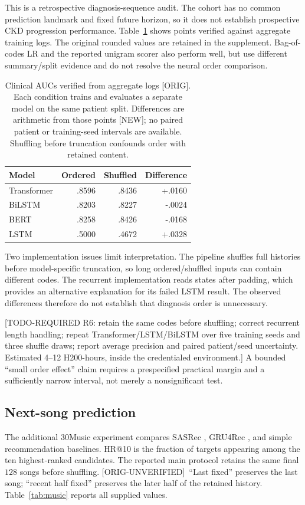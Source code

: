 \documentclass[10pt]{article}
\newcommand{\prov}[1]{{\color{black!65}\scriptsize[#1]}}
\newcommand{\orig}{\prov{ORIG}}
\newcommand{\ou}{\prov{ORIG-UNVERIFIED}}
\newcommand{\newres}{\prov{NEW}}
\newcommand{\req}[2]{{\color{brown!75!black}\small[TODO-REQUIRED #1: #2]}}
\begin{document}
This is a retrospective diagnosis-sequence audit. The cohort has no common prediction landmark and fixed future horizon, so it does not establish prospective CKD progression performance. Table~\ref{tab:clinical} shows points verified against aggregate training logs. The original rounded values are retained in the supplement. Bag-of-codes LR and the reported unigram scorer also perform well, but use different summary/split evidence and do not resolve the neural order comparison.

\begin{table}[H]
\centering\small
\caption{Clinical AUCs verified from aggregate logs \orig. Each condition trains and evaluates a separate model on the same patient split. Differences are arithmetic from those points \newres; no paired patient or training-seed intervals are available. Shuffling before truncation confounds order with retained content.}
\label{tab:clinical}
\begin{tabular}{@{}lrrr@{}}\toprule
Model & Ordered & Shuffled & Difference \\\midrule
Transformer & .8596 & .8436 & +.0160 \\
BiLSTM & .8203 & .8227 & -.0024 \\
BERT & .8258 & .8426 & -.0168 \\
LSTM & .5000 & .4672 & +.0328 \\
\bottomrule\end{tabular}
\end{table}

Two implementation issues limit interpretation. The pipeline shuffles full histories before model-specific truncation, so long ordered/shuffled inputs can contain different codes. The recurrent implementation reads states after padding, which provides an alternative explanation for its failed LSTM result. The observed differences therefore do not establish that diagnosis order is unnecessary.

\req{R6}{retain the same codes before shuffling; correct recurrent length handling; repeat Transformer/LSTM/BiLSTM over five training seeds and three shuffle draws; report average precision and paired patient/seed uncertainty. Estimated 4--12 H200-hours, inside the credentialed environment.} A bounded ``small order effect'' claim requires a prespecified practical margin and a sufficiently narrow interval, not merely a nonsignificant test.

\subsection{Next-song prediction}
The additional 30Music experiment \citep{turrin2015} compares SASRec \citep{kang2018}, GRU4Rec \citep{hidasi2015}, and simple recommendation baselines. HR@10 is the fraction of targets appearing among the ten highest-ranked candidates. The reported main protocol retains the same final $128$ songs before shuffling. \ou\ ``Last fixed'' preserves the last song; ``recent half fixed'' preserves the later half of the retained history. Table~\ref{tab:music} reports all supplied values.
\end{document}

